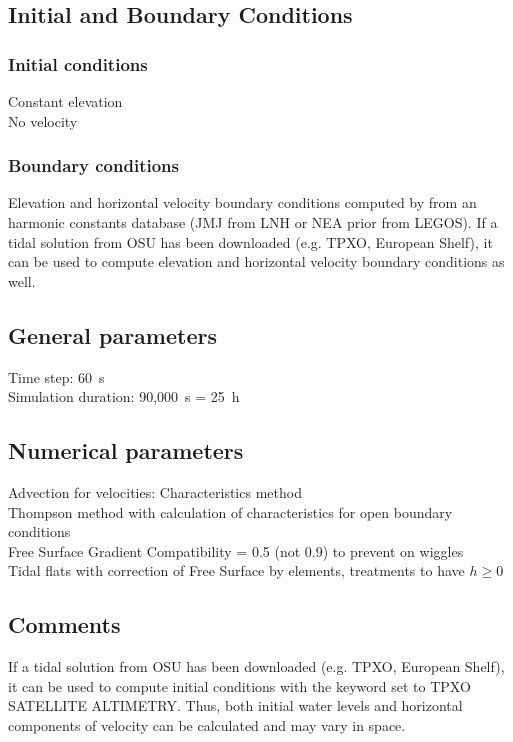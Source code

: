 \subsection{Initial and Boundary Conditions}
%
\subsubsection{Initial conditions}
%
Constant elevation\\
No velocity
%
\subsubsection{Boundary conditions}
%
Elevation and horizontal velocity boundary conditions computed by
 from an harmonic constants database (JMJ from LNH or
NEA prior from LEGOS).
If a tidal solution from OSU has been downloaded (e.g. TPXO, European
Shelf), it can be used to compute elevation and horizontal velocity
boundary conditions as well.
%
\subsection{General parameters}
%
Time step: 60~s\\
Simulation duration: 90,000~s = 25~h
%
%
%
\subsection{Numerical parameters}
%
Advection for velocities: Characteristics method\\
Thompson method with calculation of characteristics for open boundary
conditions\\
Free Surface Gradient Compatibility = 0.5 (not 0.9) to prevent on
wiggles\\
Tidal flats with correction of Free Surface by elements, treatments
to have $h \ge 0$
%
\subsection{Comments}
%
If a tidal solution from OSU has been downloaded (e.g. TPXO, European
Shelf), it can be used to compute initial conditions with the keyword
 set to TPXO SATELLITE ALTIMETRY.
Thus, both initial water levels and horizontal components of velocity
can be calculated and may vary in space.
%
%
%
